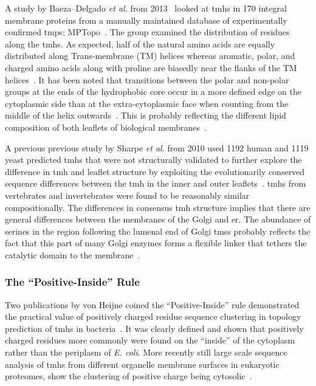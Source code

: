 A study by Baeza\---Delgado \textit{ et al.} from 2013~\cite{Baeza-Delgado2013} looked at \gls{tmh}s in 170 integral membrane proteins from a manually maintained database of experimentally confirmed \gls{tmp}s; MPTopo~\cite{Jayasinghe2001}. The group examined the distribution of residues along the \gls{tmh}s. As expected, half of the natural amino acids are equally distributed along Trans-membrane (TM) helices whereas aromatic, polar, and charged amino acids along with proline are biasedly near the flanks of the TM helices~\cite{Baeza-Delgado2013}. It has been noted that transitions between the polar and non-polar groups at the ends of the hydrophobic core occur in a more defined edge on the cytoplasmic side than at the extra-cytoplasmic face when counting from the middle of the helix outwards~\cite{Baeza-Delgado2013}. This is probably reflecting the different lipid composition of both leaflets of biological membranes~\cite{Baeza-Delgado2013}.

A previous previous study by Sharpe \textit{ et al.} from 2010 used 1192 human and 1119 yeast predicted \gls{tmh}s that were not structurally validated to further explore the difference in \gls{tmh} and leaflet structure by exploiting the evolutionarily conserved sequence differences between the \gls{tmh} in the inner and outer leaflets~\cite{Sharpe2010}. \gls{tmh}s from vertebrates and invertebrates were found to be reasonably similar compositionally. The differences in consensus \gls{tmh} structure implies that there are general differences between the membranes of the Golgi and \gls{er}. The abundance of serines in the region following the lumenal end of Golgi \gls{tms}s probably reflects the fact that this part of many Golgi enzymes forms a flexible linker that tethers the catalytic domain to the membrane~\cite{Sharpe2010}.

\subsubsection{The ``Positive-Inside'' Rule}

Two publications by von Heijne coined the ``Positive-Inside'' rule demonstrated the practical value of positively charged residue sequence clustering in topology prediction of \gls{tmh}s in bacteria~\cite{VonHeijne1989,VonHeijne1992}. It was clearly defined and shown that positively charged residues more commonly were found on the ``inside'' of the cytoplasm rather than the periplasm of \textit{ E. coli}. More recently still large scale sequence analysis of \gls{tmh}s from different organelle membrane surfaces in eukaryotic proteomes, show the clustering of positive charge being cytosolic~\cite{Sharpe2010, Baeza-Delgado2013, Pogozheva2013}.

